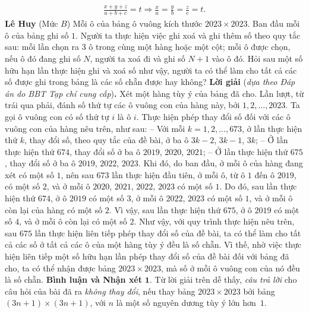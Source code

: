 \begin{multicols}{2}
	\begin{align*}
		\frac{{x + y + z}}{{a + b + c}} = t \Rightarrow \frac{x}{a} = \frac{y}{b} = \frac{z}{c} = t.
	\end{align*}
	\hfill\textbf{\color{thachthuctoanhoc}Lê Huy}
	\vskip 0.05cm
	{}
	(Mức $B$) Mỗi ô của bảng ô vuông kích thước $2023\times2023$. Ban đầu mỗi ô của bảng ghi số $1$. Người ta thực hiện việc ghi xoá và ghi thêm số theo quy tắc sau: mỗi lần chọn ra $3$ ô trong cùng một hàng hoặc một cột; mỗi ô được chọn, nếu ô đó đang ghi số $N$, người ta xoá đi và ghi số $N+1$ vào ô đó. 
	\vskip 0.05cm
	Hỏi sau một số hữu hạn lần thực hiện ghi và xoá số như vậy, người ta có thể làm cho tất cả các số được ghi trong bảng là các số chẵn được hay không?
	\vskip 0.1cm
	\textbf{\color{thachthuctoanhoc}Lời giải} (\textit{dựa theo Đáp án do BBT Tạp chí cung cấp})\textbf{\color{thachthuctoanhoc}.}
	\vskip 0.05cm
	Xét một hàng tùy ý của bảng đã cho. Lần lượt, từ trái qua phải, đánh số thứ tự các ô vuông con của hàng này, bởi $1, 2, \ldots, 2023$. Ta gọi ô vuông con có số thứ tự $i$ là ô $i$.
	\vskip 0.05cm
	Thực hiện phép thay đổi số đối với các ô vuông con của hàng nêu trên, như sau:
	\vskip 0.05cm
	-- Với mỗi $k = 1, 2, \ldots, 673$, ở lần thực hiện thứ $k$, thay đổi số, theo quy tắc của đề bài, ở ba ô $3k - 2$, $3k - 1$, $3k$;
	\vskip 0.05cm
	-- Ở lần thực hiện thứ $674$, thay đổi số ở ba ô $2019$, $2020$, $2021$;
	\vskip 0.05cm
	-- Ở lần thực hiện thứ $675$, thay đổi số ở ba ô $2019$, $2022$, $2023$.
	\vskip 0.05cm
	Khi đó, do ban đầu, ở mỗi ô của hàng đang xét có một số $1$, nên sau $673$ lần thực hiện đầu tiên, ở mỗi ô, từ ô $1$ đến ô $2019$, có một số $2$, và ở mỗi ô $2020$, $2021$, $2022$, $2023$ có một số $1$. Do đó, sau lần thực hiện thứ $674$, ở ô $2019$ có một số $3$, ở mỗi ô $2022$, $2023$ có một số $1$, và ở mỗi ô còn lại của hàng có một số $2$. Vì vậy, sau lần thực hiện thứ $675$, ở ô $2019$ có một số $4$, và ở mỗi ô còn lại có một số $2$.
	\vskip 0.05cm
	Như vậy, với quy trình thực hiện nêu trên, sau $675$ lần thực hiện liên tiếp phép thay đổi số của đề bài, ta có thể làm cho tất cả các số ở tất cả các ô của một hàng tùy ý đều là số chẵn. Vì thế, nhờ việc thực hiện liên tiếp một số hữu hạn lần phép thay đổi số của đề bài đối với bảng đã cho, ta có thể nhận được bảng $2023 \times 2023$, mà số ở mỗi ô vuông con của nó đều là số chẵn.
	\vskip 0.05cm
	\textbf{\color{thachthuctoanhoc}Bình luận và Nhận xét}
	\vskip 0.05cm
	$\pmb{1.}$ Từ lời giải trên dễ thấy, \textit{câu trả lời} cho câu hỏi của bài đã ra \textit{không thay đổi}, nếu thay bảng $2023 \!\!\times\!\! 2023$ bởi bảng $(3n \!+\!\! 1\!) \!\!\times\!\! (3n \!+\!\! 1\!)$, với $n$ là một số nguyên dương tùy ý lớn hơn~$1$.

\end{multicols}
